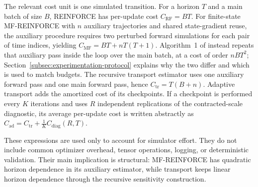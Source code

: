 The relevant cost unit is one simulated transition. For a horizon $T$ and a main batch of size $B$, REINFORCE has per-update cost $C_{\mathrm{RF}} = BT$.
For finite-state MF-REINFORCE with $n$ auxiliary trajectories and shared state-gradient reuse, the auxiliary procedure requires two perturbed forward simulations for each pair of time indices, yielding $C_{\mathrm{MF}} = BT + nT(T+1)$. Algorithm~1 of \cite{meunier2026model} instead repeats that auxiliary pass inside the loop over the main batch, at a cost of order $nBT^2$; Section~\ref{subsec:experimentation-protocol} explains why the two differ and which is used to match budgets.
The recursive transport estimator uses one auxiliary forward pass and one main forward pass, hence $C_{\mathrm{tr}} = T(B+n)$.
Adaptive transport adds the amortized cost of its checkpoints. If a checkpoint is performed every $K$ iterations and uses $R$ independent replications of the contracted-scale diagnostic, its average per-update cost is written abstractly as $C_{\mathrm{ad}} = C_{\mathrm{tr}} + \frac1K C_{\mathrm{diag}}(R,T)$.

These expressions are used only to account for simulator effort. They do not include common optimizer overhead, tensor operations, logging, or deterministic validation. Their main implication is structural: MF-REINFORCE has quadratic horizon dependence in its auxiliary estimator, while transport keeps linear horizon dependence through the recursive sensitivity construction.
